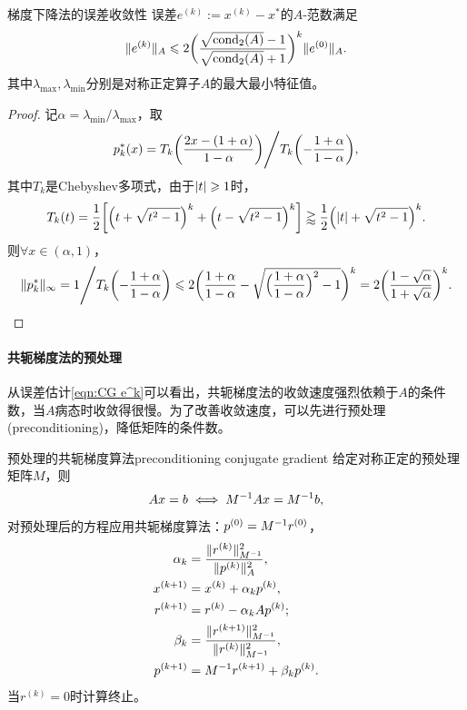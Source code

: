 \begin{theorem}
    {梯度下降法的误差收敛性}{}
    误差$e^{(k)} := x^{(k)} - x^*$的$A$-范数满足
    \begin{equation}
        \label{eqn:CG e^k}
        \lVert e^{(k)}\rVert_A \leqslant 2\biggl(\frac{\sqrt{\operatorname{cond}_2(A)} - 1}{\sqrt{\operatorname{cond}_2(A)} + 1}\biggr)^k\lVert e^{(0)}\rVert_A.
    \end{equation}
    其中$\lambda_{\max},\lambda_{\min}$分别是对称正定算子$A$的最大最小特征值。
\end{theorem}

\begin{proof}
    记$\alpha = \lambda_{\min}/\lambda_{\max}$，取
    \[
        p_k^*(x) = {T_k\biggl(\frac{2x - (1 + \alpha)}{1 - \alpha}\biggr)}\Bigg/{T_k\biggl(-\frac{1 + \alpha}{1 - \alpha}\biggr)},
    \]
    其中$T_k$是Chebyshev多项式，由于$\lvert t\rvert \geqslant 1$时，
    \[
        T_k(t) = \frac12\biggl[\Bigl(t + \sqrt{t^2 - 1}\Bigr)^k + \Bigl(t - \sqrt{t^2 - 1}\Bigr)^k\biggr]\gtrapprox \frac12\Bigl(\lvert t\rvert + \sqrt{t^2 - 1}\Bigr)^k.
    \]
    则$\forall x \in (\alpha,1)$，
    \[
        \lVert p_k^*\rVert_\infty = {1}\Bigg/{T_k\biggl(-\frac{1 + \alpha}{1 - \alpha}\biggr)} \leqslant 2\biggl(\frac{1 + \alpha}{1 - \alpha} - \sqrt{\Bigl(\frac{1 + \alpha}{1 - \alpha}\Bigr)^2 - 1}\biggr)^k = 2\biggl(\frac{1 - \sqrt\alpha}{1 + \sqrt\alpha}\biggr)^k.
        \qedhere
    \]
\end{proof}

\paragraph{共轭梯度法的预处理}

从误差估计\eqref{eqn:CG e^k}可以看出，共轭梯度法的收敛速度强烈依赖于$A$的条件数，当$A$病态时收敛得很慢。为了改善收敛速度，可以先进行预处理(preconditioning)，降低矩阵的条件数。

\begin{theorem}
    {预处理的共轭梯度算法}{preconditioning conjugate gradient}
    给定对称正定的预处理矩阵$M$，则
    \begin{equation}\label{eq:na-preconditioned-system}
        Ax = b \iff M^{-1} Ax = M^{-1} b,
    \end{equation}
    对预处理后的方程应用共轭梯度算法：$p^{(0)} = M^{-1} r^{(0)}$，
    \begin{subequations}
        \begin{align}
            \alpha_k &= \frac{\lVert r^{(k)}\rVert_{M^{-1}}^2}{\lVert p^{(k)}\rVert_A^2},\\
            x^{(k+1)} &= x^{(k)} + \alpha_kp^{(k)},\\
            r^{(k+1)} &= r^{(k)} - \alpha_kAp^{(k)};\\
            \beta_k &= \frac{\lVert r^{(k+1)}\rVert_{M^{-1}}^2}{\lVert r^{(k)}\rVert_{M^{-1}}^2},\\
            p^{(k+1)} &= M^{-1} r^{(k+1)} + \beta_kp^{(k)}.
        \end{align}
    \end{subequations}
    当$r^{(k)} = 0$时计算终止。
\end{theorem}

